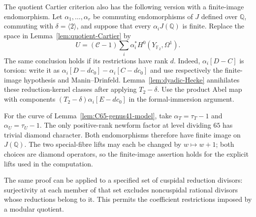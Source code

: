 The quotient Cartier criterion also has the following version with a
finite-image endomorphism. Let $\alpha_1,\ldots,\alpha_r$ be commuting
endomorphisms of $J$ defined over $\mathbb Q$, commuting with
$\delta=\langle2\rangle$, and suppose that every
$\alpha_iJ(\mathbb Q)$ is finite. Replace the space in
Lemma~\ref{lem:quotient-Cartier} by
\[
 U=(\mathcal C-1)\sum_i\alpha_i^*H^0(Y_{\mathbb F_2},\Omega^1).
\]
The same conclusion holds if its restrictions have rank $d$.
Indeed, $\alpha_i[D-C]$ is torsion: write it as
$\alpha_i[D-dc_0]-\alpha_i[C-dc_0]$ and use respectively the finite-image
hypothesis and Manin--Drinfeld. Lemma~\ref{lem:dyadic-Hecke} annihilates
these reduction-kernel classes after applying $T_2-\delta$.
Use the product Abel map with components
$(T_2-\delta)\alpha_i[E-dc_0]$ in the formal-immersion argument.

For the curve of Lemma~\ref{lem:C65-genus41-model}, take
$\alpha_T=\tau_T-1$ and $\alpha_U=\tau_U-1$.
The only positive-rank newform factor at level dividing $65$ has trivial
diamond character. Both endomorphisms therefore have finite image on
$J(\mathbb Q)$. The two special-fibre lifts may each be changed by
$w\mapsto w+1$; both choices are diamond operators, so the finite-image
assertion holds for the explicit lifts used in the computation.

The same proof can be applied to a specified set of cuspidal reduction
divisors: surjectivity at each member of that set excludes noncuspidal
rational divisors whose reductions belong to it. This permits the
coefficient restrictions imposed by a modular quotient.
